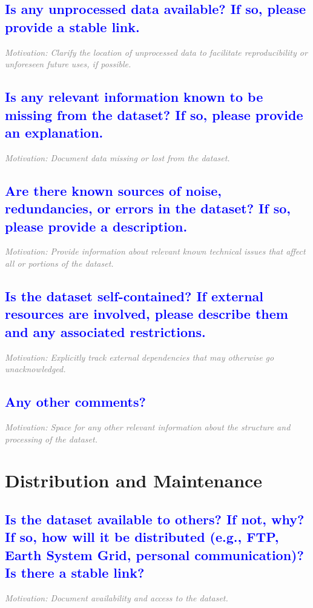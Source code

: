 \documentclass[letterpaper, 10 pt, transmag]{IEEEtran}
\begin{document}
\textcolor{blue}{\subsection{Is any unprocessed data available? If so, please provide a stable link.}}
\textcolor{gray}{\textit{Motivation: Clarify the location of unprocessed data to facilitate reproducibility or unforeseen future uses, if possible.}}

\textcolor{blue}{\subsection{Is any relevant information known to be missing from the dataset? If so, please provide an explanation.}}
\textcolor{gray}{\textit{Motivation: Document data missing or lost from the dataset.}}

\textcolor{blue}{\subsection{Are there known sources of noise, redundancies, or errors in the dataset? If so, please provide a description.}}
\textcolor{gray}{\textit{Motivation: Provide information about relevant known technical issues that affect all or portions of the dataset.}}

\textcolor{blue}{\subsection{Is the dataset self-contained? If external resources are involved, please describe them and any associated restrictions.}}
\textcolor{gray}{\textit{Motivation: Explicitly track external dependencies that may otherwise go unacknowledged.}}

\textcolor{blue}{\subsection{Any other comments?}}
\textcolor{gray}{\textit{Motivation: Space for any other relevant information about the structure and processing of the dataset.}}  
\vspace{10mm}

\section{Distribution and Maintenance}

\textcolor{blue}{\subsection{Is the dataset available to others? If not, why? If so, how will it be distributed (e.g., FTP, Earth System Grid, personal communication)? Is there a stable link?}}
\textcolor{gray}{\textit{Motivation: Document availability and access to the dataset.}}
\end{document}
